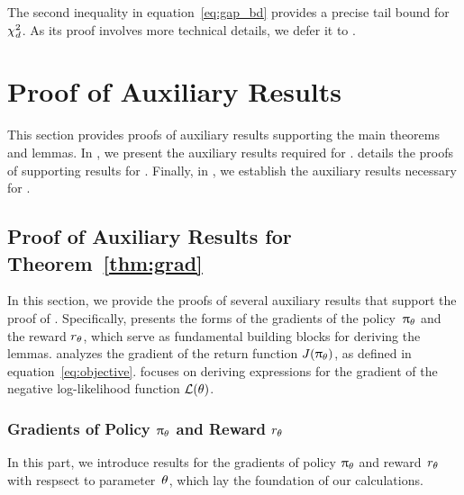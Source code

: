 	The second inequality in equation~\eqref{eq:gap_bd} provides a precise tail bound for $\chi^2_{d}$. As its proof involves more technical details, we defer it to .
	

	


	
	

	\section{Proof of Auxiliary Results \yaqidone}
    \label{app:aux}
	
	This section provides proofs of auxiliary results supporting the main theorems and lemmas. In , we present the auxiliary results required for .  details the proofs of supporting results for . Finally, in , we establish the auxiliary results necessary for .

	\subsection{Proof of Auxiliary Results for Theorem~\ref{thm:grad} \yaqidone}
	\label{sec:proof:aux:thm:grad}
	
		In this section, we provide the proofs of several auxiliary results that support the proof of . Specifically,
		 presents the forms of the gradients of the policy~$\uppi_{\theta}$ and the reward $r_{\theta}$, which serve as fundamental building blocks for deriving the lemmas.
		 analyzes the gradient of the return function $J(\uppi_{\theta})$, as defined in equation~\eqref{eq:objective}.
		 focuses on deriving expressions for the gradient of the negative log-likelihood function $\mathcal{L}(\theta)$.
	
		\subsubsection{Gradients of Policy $\uppi_{\theta}$ and Reward $r_{\theta}$}
		\label{sec:proof:lemma:grad_policy}
		
		In this part, we introduce results for the gradients of policy $\uppi_{\theta}$ and reward~$r_{\theta}$ with respsect to parameter~$\theta$, which lay the foundation of our calculations.
		
